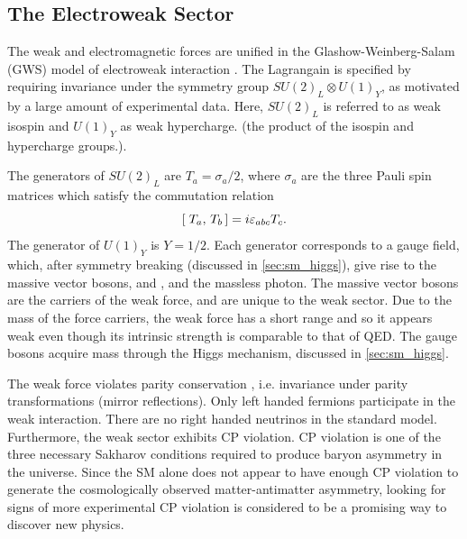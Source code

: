 \subsection{The Electroweak Sector}\label{sec:ew_sector}

The weak and electromagnetic forces are unified in the Glashow-Weinberg-Salam (GWS) model of electroweak interaction \cite{Glashow:1961tr,Weinberg:1967tq,Salam:1968rm}.
The Lagrangain is specified by requiring invariance under the symmetry group $SU(2)_L \otimes U(1)_Y$, as motivated by a large amount of experimental data.
Here, $SU(2)_L$ is referred to as weak isospin and $U(1)_Y$ as weak hypercharge. (the product of the isospin and hypercharge groups.).

The generators of $SU(2)_L$ are $T_a = \sigma_a/2$, where $\sigma_a$ are the three Pauli spin matrices which satisfy the commutation relation 
%
\begin{equation}
[\; T_a,\,T_b\,] = i \varepsilon_{abc} T_c .
\end{equation}
%
The generator of $U(1)_Y$ is $Y = 1/2$.
Each generator corresponds to a gauge field, which, after symmetry breaking (discussed in \cref{sec:sm_higgs}), give rise to the massive vector bosons, \Wpm and \Zboson, and the massless photon.
The massive vector bosons are the carriers of the weak force, and are unique to the weak sector.
Due to the mass of the force carriers, the weak force has a short range and so it appears weak even though its intrinsic strength is comparable to that of QED.
The gauge bosons acquire mass through the Higgs mechanism, discussed in \cref{sec:sm_higgs}.

The weak force violates parity conservation \cite{PhysRev.104.254,PhysRev.105.1413,PhysRev.105.1415}, i.e. invariance under parity transformations (mirror reflections).
Only left handed fermions participate in the weak interaction.
There are no right handed neutrinos in the standard model.
Furthermore, the weak sector exhibits CP violation.
CP violation is one of the three necessary Sakharov conditions required to produce baryon asymmetry in the universe.
Since the SM alone does not appear to have enough CP violation to generate the cosmologically observed matter-antimatter asymmetry, looking for signs of more experimental CP violation is considered to be a promising way to discover new physics.


